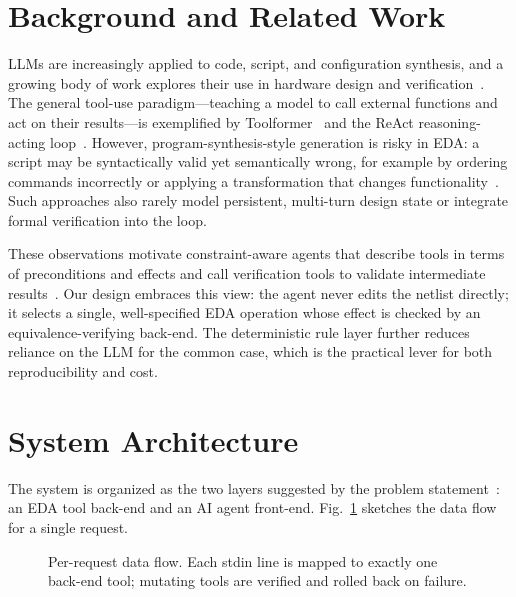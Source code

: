 \documentclass[conference]{IEEEtran}
\begin{document}
\section{Background and Related Work}
LLMs are increasingly applied to code, script, and configuration synthesis,
and a growing body of work explores their use in hardware design and
verification~\cite{chateda}. The general tool-use paradigm---teaching a model
to call external functions and act on their results---is exemplified by
Toolformer~\cite{toolformer} and the ReAct reasoning-acting
loop~\cite{react}. However, program-synthesis-style generation is risky in
EDA: a script may be syntactically valid yet semantically wrong, for example by
ordering commands incorrectly or applying a transformation that changes
functionality~\cite{problemA}. Such approaches also rarely model persistent,
multi-turn design state or integrate formal verification into the loop.

These observations motivate constraint-aware agents that describe tools in
terms of preconditions and effects and call verification tools to validate
intermediate results~\cite{agentspec}. Our design embraces this view: the
agent never edits the netlist directly; it selects a single, well-specified
EDA operation whose effect is checked by an equivalence-verifying back-end. The
deterministic rule layer further reduces reliance on the LLM for the common
case, which is the practical lever for both reproducibility and cost.

\section{System Architecture}
The system is organized as the two layers suggested by the problem
statement~\cite{problemA}: an EDA tool back-end and an AI agent front-end.
Fig.~\ref{fig:arch} sketches the data flow for a single request.

\begin{figure}[t]
\centering
{}
\caption{Per-request data flow. Each stdin line is mapped to exactly one
back-end tool; mutating tools are verified and rolled back on failure.}
\label{fig:arch}
\end{figure}
\end{document}
